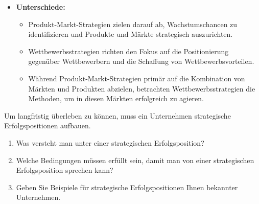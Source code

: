 {\begin{itemize}
    \item \textbf{Unterschiede:}
    \begin{itemize}
        \item Produkt-Markt-Strategien zielen darauf ab, Wachstumschancen zu identifizieren und Produkte und Märkte strategisch auszurichten.
        \item Wettbewerbsstrategien richten den Fokus auf die Positionierung gegenüber Wettbewerbern und die Schaffung von Wettbewerbsvorteilen.
        \item Während Produkt-Markt-Strategien primär auf die Kombination von Märkten und Produkten abzielen, betrachten Wettbewerbsstrategien die Methoden, um in diesen Märkten erfolgreich zu agieren.
    \end{itemize}
\end{itemize}
}
Um langfristig überleben zu können, muss ein Unternehmen strategische Erfolgspositionen aufbauen.

\begin{enumerate}[label=(\alph*)]
    \item Was versteht man unter einer strategischen Erfolgsposition?
    \item Welche Bedingungen müssen erfüllt sein, damit man von einer strategischen Erfolgsposition sprechen kann?
    \item Geben Sie Beispiele für strategische Erfolgspositionen Ihnen bekannter Unternehmen.
\end{enumerate}

